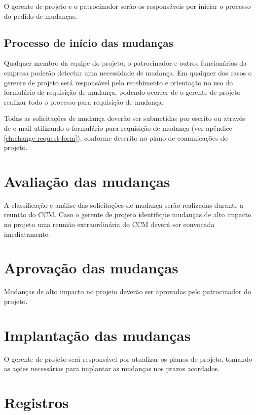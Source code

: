 O gerente de projeto e o patrocinador serão os responsáveis por iniciar o processo do pedido de mudanças.

\subsection{Processo de início das mudanças}

Qualquer membro da equipe do projeto, o patrocinador e outros funcionários da empresa poderão detectar uma necessidade de mudança. Em quaiquer dos casos o gerente de projeto será responsável pelo recebimento e orientação no uso do formulário de requisição de mudança, podendo ocorrer de o gerente de projeto realizar todo o processo para requisição de mudança.

Todas as solicitações de mudança deverão ser submetidas por escrito ou através de e-mail utilizando o formulário para requisição de mudança (ver apêndice \ref{ch:change-request-form}), conforme descrito no plano de comunicações do projeto.

\section{Avaliação das mudanças}

A classificação e análise das solicitações de mudança serão realizadas durante a reunião do CCM. Caso o gerente de projeto identifique mudanças de alto impacto no projeto uma reunião extraordinária do CCM deverá ser convocada imediatamente.

\section{Aprovação das mudanças}

Mudanças de alto impacto no projeto deverão ser aprovadas pelo patrocinador do projeto.

\section{Implantação das mudanças}

O gerente de projeto será responsável por atualizar os planos de projeto, tomando as ações necessárias para implantar as mudanças nos prazos acordados.

\section{Registros}

